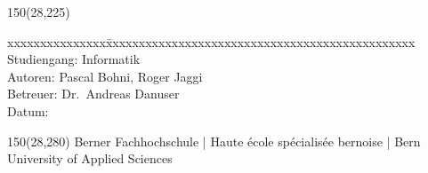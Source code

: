 \begin{titlepage}
\begin{flushleft}
\begin{textblock}{150}(28,225)
\fontsize{10pt}{17pt}\selectfont
\begin{tabbing}
xxxxxxxxxxxxxxx\=xxxxxxxxxxxxxxxxxxxxxxxxxxxxxxxxxxxxxxxxxxxxxxx \kill
Studiengang:	\> Informatik	\\			%
Autoren:		\> Pascal Bohni, Roger Jaggi		\\					%
Betreuer:	\> Dr.~Andreas Danuser		\\					%
Datum:			\> \versiondate					\\		%
\end{tabbing}

\end{textblock}
\end{flushleft}

\begin{textblock}{150}(28,280)
\noindent 
\color{bfhgrey}\fontsize{9pt}{10pt}\selectfont
Berner Fachhochschule | Haute école spécialisée bernoise | Bern University of Applied Sciences
\color{black}\selectfont
\end{textblock}


\end{titlepage}

%
%
